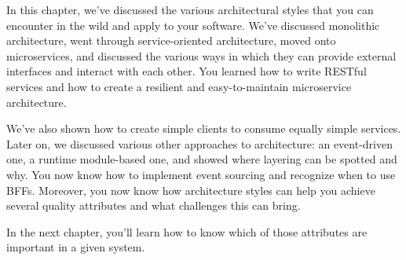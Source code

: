 In this chapter, we've discussed the various architectural styles that you can encounter in the wild and apply to your software. We've discussed monolithic architecture, went through service-oriented architecture, moved onto microservices, and discussed the various ways in which they can provide external interfaces and interact with each other. You learned how to write RESTful services and how to create a resilient and easy-to-maintain microservice architecture.

We've also shown how to create simple clients to consume equally simple services. Later on, we discussed various other approaches to architecture: an event-driven one, a runtime module-based one, and showed where layering can be spotted and why. You now know how to implement event sourcing and recognize when to use BFFs. Moreover, you now know how architecture styles can help you achieve several quality attributes and what challenges this can bring.

In the next chapter, you'll learn how to know which of those attributes are important in a given system.


